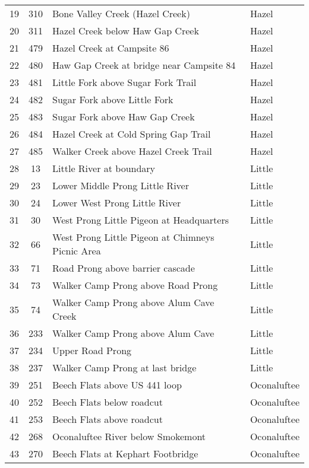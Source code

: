 \begin{table}[h]
\begin{tabular}{ccll}
19 & 310       & Bone Valley Creek (Hazel Creek)                            & Hazel \\ 
20 & 311       & Hazel Creek below Haw Gap Creek                        & Hazel \\ 
21 & 479       & Hazel Creek at Campsite 86                                   & Hazel \\ 
22 & 480       & Haw Gap Creek at bridge near Campsite 84          & Hazel \\ 
23 & 481       & Little Fork above Sugar Fork Trail                           & Hazel \\ 
24 & 482       & Sugar Fork above Little Fork                                  & Hazel \\  
25 & 483       & Sugar Fork above Haw Gap Creek                         & Hazel \\ 
26 & 484       & Hazel Creek at Cold Spring Gap Trail                      & Hazel \\ 
27 & 485       & Walker Creek above Hazel Creek Trail                   & Hazel \\ 
28 & 13         & Little River at boundary                                         & Little \\ 
29 & 23         & Lower Middle Prong Little River                              & Little \\ 
30 & 24         & Lower West Prong Little River                                & Little \\ 
31 & 30         & West Prong Little Pigeon at Headquarters             & Little\\ 
32 & 66         & West Prong Little Pigeon at Chimneys Picnic Area & Little \\ 
33 & 71         & Road Prong above barrier cascade                        & Little \\ 
34 & 73         & Walker Camp Prong above Road Prong                 & Little \\ 
35 & 74         & Walker Camp Prong above Alum Cave Creek        & Little \\ 
36 & 233       & Walker Camp Prong above Alum Cave                  & Little \\ 
37 & 234       & Upper Road Prong                                                 & Little \\ 
38 & 237       & Walker Camp Prong at last bridge                         & Little \\ 
39 & 251       & Beech Flats above US 441 loop                             & Oconaluftee \\ 
40 & 252       & Beech Flats below roadcut                                    & Oconaluftee \\ 
41 & 253       & Beech Flats above roadcut                                   & Oconaluftee \\ 
42 & 268       & Oconaluftee River below Smokemont                   & Oconaluftee \\ 
43 & 270       & Beech Flats at Kephart Footbridge                       & Oconaluftee \\  
\bottomrule
\end{tabular}
\label{tab:Site Data}
\end{table}
